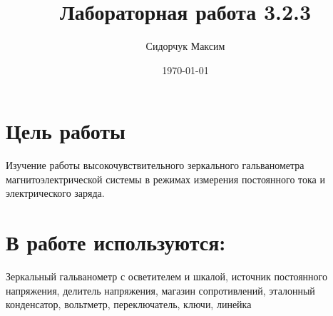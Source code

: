 \documentclass[a4paper]{article}
\date{\today}
\title{Лабораторная работа 3.2.3}
\author{Сидорчук Максим}
\begin{document}
\maketitle

\section{Цель работы}
Изучение работы высокочувствительного зеркального гальванометра магнитоэлектрической системы в режимах измерения постоянного тока и электрического заряда.

\section{В работе используются:}
Зеркальный гальванометр с осветителем и шкалой, источник постоянного напряжения, делитель напряжения, магазин сопротивлений, эталонный конденсатор, вольтметр, переключатель, ключи, линейка



\end{document}
